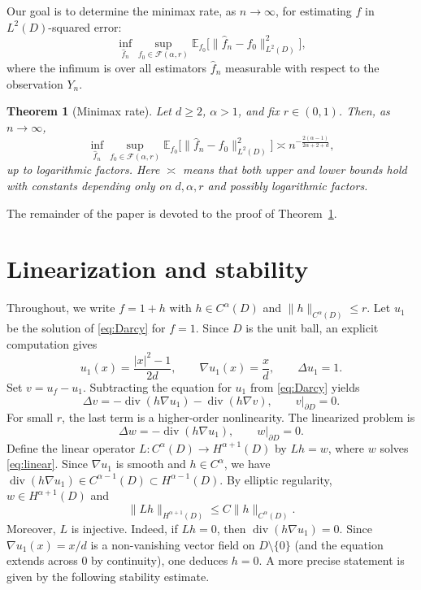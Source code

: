 \documentclass[11pt]{article}
\newtheorem{theorem}{Theorem}[section]
\theoremstyle{definition}
\theoremstyle{remark}
\newcommand{\E}{\mathbb{E}}
\newcommand{\Calpha}{C^\alpha(D)}
\newcommand{\F}{\mathcal{F}}
\begin{document}
Our goal is to determine the minimax rate, as \(n\to\infty\), for estimating \(f\) in \(L^2(D)\)-squared error:
\begin{equation}\label{eq:risk}
\inf_{\hat f_n}\sup_{f_0\in \F(\alpha,r)}
\E_{f_0}\bigl[\|\hat f_n-f_0\|_{L^2(D)}^2\bigr],
\end{equation}
where the infimum is over all estimators \(\hat f_n\) measurable with respect to the observation \(Y_n\).

\begin{theorem}[Minimax rate]\label{thm:main}
Let \(d\ge 2\), \(\alpha>1\), and fix \(r\in(0,1)\). Then, as \(n\to\infty\),
\begin{equation}\label{eq:rate}
\inf_{\hat f_n}\sup_{f_0\in \F(\alpha,r)}
\E_{f_0}\bigl[\|\hat f_n-f_0\|_{L^2(D)}^2\bigr]
\asymp n^{-\frac{2(\alpha-1)}{2\alpha+2+d}},
\end{equation}
up to logarithmic factors. Here \(\asymp\) means that both upper and lower bounds hold with constants depending only on \(d,\alpha,r\) and possibly logarithmic factors.
\end{theorem}

The remainder of the paper is devoted to the proof of Theorem~\ref{thm:main}.

\section{Linearization and stability}

Throughout, we write \(f=1+h\) with \(h\in C^\alpha(D)\) and \(\|h\|_{C^\alpha(D)}\le r\). Let \(u_1\) be the solution of \eqref{eq:Darcy} for \(f=1\). Since \(D\) is the unit ball, an explicit computation gives
\begin{equation}\label{eq:u1}
u_1(x)=\frac{|x|^2-1}{2d},\qquad \nabla u_1(x)=\frac{x}{d},\qquad \Delta u_1=1.
\end{equation}
Set \(v=u_f-u_1\). Subtracting the equation for \(u_1\) from \eqref{eq:Darcy} yields
\begin{equation}\label{eq:v}
\Delta v=-\operatorname{div}(h\nabla u_1)-\operatorname{div}(h\nabla v),\qquad v|_{\partial D}=0.
\end{equation}
For small \(r\), the last term is a higher-order nonlinearity. The linearized problem is
\begin{equation}\label{eq:linear}
\Delta w=-\operatorname{div}(h\nabla u_1),\qquad w|_{\partial D}=0.
\end{equation}
Define the linear operator \(L:\Calpha\to H^{\alpha+1}(D)\) by \(Lh=w\), where \(w\) solves \eqref{eq:linear}. Since \(\nabla u_1\) is smooth and \(h\in C^\alpha\), we have \(\operatorname{div}(h\nabla u_1)\in C^{\alpha-1}(D)\subset H^{\alpha-1}(D)\). By elliptic regularity, \(w\in H^{\alpha+1}(D)\) and
\begin{equation}\label{eq:Lbound}
\|Lh\|_{H^{\alpha+1}(D)}\le C\|h\|_{C^\alpha(D)}.
\end{equation}
Moreover, \(L\) is injective. Indeed, if \(Lh=0\), then \(\operatorname{div}(h\nabla u_1)=0\). Since \(\nabla u_1(x)=x/d\) is a non-vanishing vector field on \(D\setminus\{0\}\) (and the equation extends across \(0\) by continuity), one deduces \(h=0\). A more precise statement is given by the following stability estimate.
\end{document}
